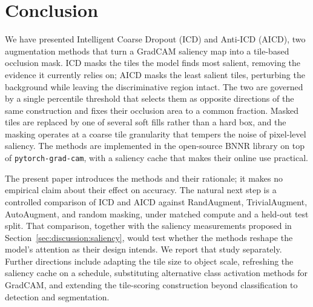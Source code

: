 \section{Conclusion}
\label{sec:conclusion}

We have presented Intelligent Coarse Dropout (ICD) and Anti-ICD (AICD), two
augmentation methods that turn a GradCAM saliency map into a tile-based
occlusion mask.  ICD masks the tiles the model finds most salient, removing the
evidence it currently relies on; AICD masks the least salient tiles, perturbing
the background while leaving the discriminative region intact.  The two are
governed by a single percentile threshold that selects them as opposite
directions of the same construction and fixes their occlusion area to a common
fraction.  Masked tiles are replaced by one of several soft fills rather than a
hard box, and the masking operates at a coarse tile granularity that tempers the
noise of pixel-level saliency.  The methods are implemented in the open-source
BNNR library on top of \texttt{pytorch-grad-cam}, with a saliency cache that
makes their online use practical.

The present paper introduces the methods and their rationale; it makes no
empirical claim about their effect on accuracy.  The natural next step is a
controlled comparison of ICD and AICD against RandAugment, TrivialAugment,
AutoAugment, and random masking, under matched compute and a held-out test
split.  That comparison, together with the saliency measurements proposed in
Section~\ref{sec:discussion:saliency}, would test whether the methods reshape the
model's attention as their design intends.  We report that study separately.
Further directions include adapting the tile size to object scale, refreshing
the saliency cache on a schedule, substituting alternative class activation
methods for GradCAM, and extending the tile-scoring construction beyond
classification to detection and segmentation.
